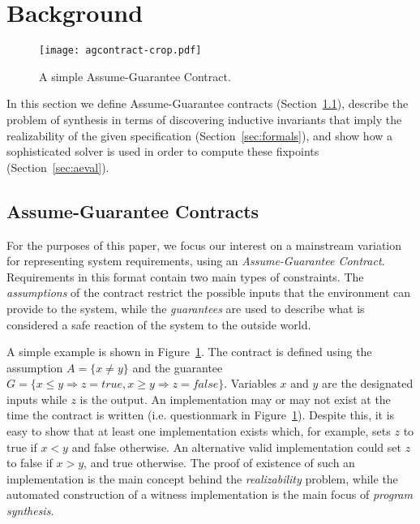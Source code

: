 \section{Background}
\label{sec:background}


\begin{figure}[!t]
\centering
\texttt{[image: agcontract-crop.pdf]}
\caption{A simple Assume-Guarantee Contract. }
\label{fg:agcontract}
\end{figure}


In this section we define Assume-Guarantee contracts (Section~\ref{sec:pre}),
describe the problem of synthesis in terms of discovering inductive invariants that imply the realizability of the given specification (Section~\ref{sec:formals}), and show how a sophisticated solver is used in order to compute these fixpoints (Section~\ref{sec:aeval}).

\subsection{Assume-Guarantee Contracts}
\label{sec:pre}

For the purposes of this paper, we focus our interest on a mainstream variation
for representing system requirements, using an \textit{Assume-Guarantee
Contract}. Requirements in this format contain two main types of constraints.
The \emph{assumptions} of the contract restrict the possible inputs that the
environment can provide to the system, while the \emph{guarantees} are used to
describe what is considered a safe reaction of the system to the outside world.

A simple example is shown in Figure~\ref{fg:agcontract}. The contract is defined using the assumption $A = \{x\neq
y\}$ and the guarantee $G = \{x \leq y \Rightarrow z =
\textit{true}, x \geq y \Rightarrow z = \textit{false}\}$. Variables
$x$ and $y$ are the designated inputs while $z$ is the output. An implementation may or may not exist at the time the contract is written (i.e. questionmark in Figure~\ref{fg:agcontract}).
Despite this, it is easy to show that at least one implementation exists which, for example, sets $z$ to true if $x < y$ and false otherwise. An alternative
valid implementation could set $z$ to false if $x > y$, and true otherwise. The
proof of existence of such an implementation  is the main concept behind the
\emph{realizability} problem, while the automated construction of a witness
implementation is the main focus of \emph{program synthesis}.


